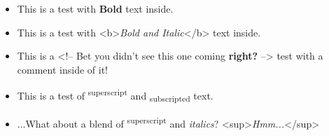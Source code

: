 \documentclass[12pt]{article}
\begin{document}
\begin{itemize}
	\item This is a test with \textbf{Bold} text inside.

	\item This is a test with <b>\textit{Bold and Italic}</b> text inside.

	\item This is a <!-- Bet you didn't see this one coming \textbf{right?} --> test with a comment inside of it!

	\item This is a test of \textsuperscript{superscript} and \textsubscript{subscripted} text.

	\item ...What about a blend of \textsuperscript{superscript} and \textit{italics}? <sup>\textit{Hmm...}</sup>

\end{itemize}
\end{document}
